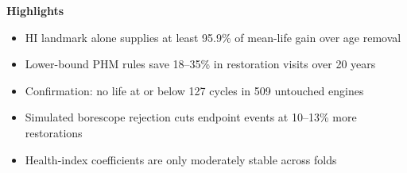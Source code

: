 \documentclass[12pt]{article}
\begin{document}
\begin{center}
  {\large\bfseries Highlights}\\[0.4em]
  
\end{center}

\bigskip

\begin{itemize}[leftmargin=1.5em, itemsep=0.5em]

  \item HI landmark alone supplies at least 95.9\% of mean-life gain over age removal

  \item Lower-bound PHM rules save 18--35\% in restoration visits over 20 years

  \item Confirmation: no life at or below 127 cycles in 509 untouched engines

  \item Simulated borescope rejection cuts endpoint events at 10--13\% more restorations

  \item Health-index coefficients are only moderately stable across folds

\end{itemize}

\end{document}

